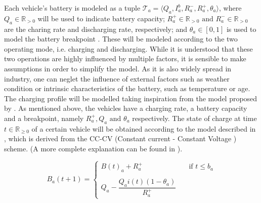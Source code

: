 Each vehicle's battery is modeled as a tuple $\mathcal{T}_a =\langle Q_a, I^b_a, R^-_a, R^+_a,\theta_a\rangle$, where $Q_a \in \mathbb{R}_{>0}$ will be used to indicate battery capacity; $R^+_a \in \mathbb{R}_{>0}\text{ and } R^-_a\in \mathbb{R}_{>0}$ are the charing rate and discharging rate,  respectively; and $\theta_a \in [0,1]$ is used to model the battery breakpoint . These will be modeled according to the two operating mode, i.e. charging and discharging. While it is understood that these two operations are highly influenced by multiple factors, it is sensible to make assumptions in order to simplify the model. 
As it is also widely spread in industry, one can neglet the influence of external factors such as weather condition or intrinsic characteristics of the battery, such as temperature or age. The charging profile will be modelled taking inspiration from the model proposed by . As mentioned above, the vehicles have a charging rate, a battery capacity and a breakpoint, namely $R^+_a, Q_a \text{ and } \theta_a$ respectively. The state of charge at time $t \in \mathbb{R}_{\ge0}$ of a certain vehicle will be obtained according to the model described in , which is derived from the CC-CV (Constant current - Constant Voltage ) scheme. (A more complete explanation can be found in \cite{LIU2020101342}).%




\begin{equation}
	B_a(t+1) = 
	\begin{cases} 
		B(t)_a + R^+_a & \quad \text{if } t \leq  b_a\\
		\\
		Q_a - \dfrac{Q_ai(t)(1-\theta_a)}{R^+_a}
		\end{cases}
		\label{eq:cc_cv}
\end{equation}

